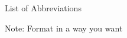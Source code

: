 \clearpage
{}  %
\begin{centering}
List of Abbreviations\\
\end{centering}

\noindent Note: Format in a way you want \\

\lipsum[1]